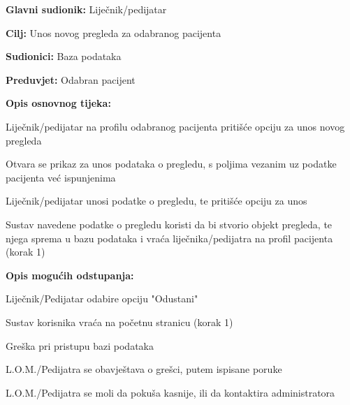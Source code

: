 					\noindent {}
					\begin{packed_item}
						
						\item \textbf{Glavni sudionik: }Liječnik/pedijatar
						\item  \textbf{Cilj:} Unos novog pregleda za odabranog pacijenta
						\item  \textbf{Sudionici:} Baza podataka
						\item  \textbf{Preduvjet:} Odabran pacijent
						\item  \textbf{Opis osnovnog tijeka:}
						
						\item[] \begin{packed_enum}
							
							\item Liječnik/pedijatar na profilu odabranog pacijenta pritišće opciju za unos novog pregleda
							\item Otvara se prikaz za unos podataka o pregledu, s poljima vezanim uz podatke pacijenta već ispunjenima
							\item Liječnik/pedijatar unosi podatke o pregledu, te pritišće opciju za unos
							\item Sustav navedene podatke o pregledu koristi da bi stvorio objekt pregleda, te njega sprema u bazu podataka i vraća liječnika/pedijatra na profil pacijenta (korak 1)
						\end{packed_enum}
						\item  \textbf{Opis mogućih odstupanja:}
						\item[] \begin{packed_item}
							\item[3.a] Liječnik/Pedijatar odabire opciju "Odustani"
							\item[] \begin{packed_enum}
								\item Sustav korisnika vraća na početnu stranicu (korak 1)
							\end{packed_enum}
							\item[4.a] Greška pri pristupu bazi podataka
							\item[] \begin{packed_enum}
								
								\item L.O.M./Pedijatra se obavještava o grešci, putem ispisane poruke
								\item L.O.M./Pedijatra se moli da pokuša kasnije, ili da kontaktira administratora
								
							\end{packed_enum}
						\end{packed_item}
						
					\end{packed_item}
					
